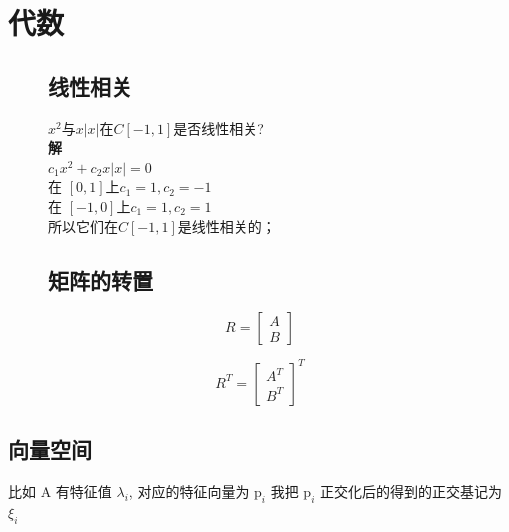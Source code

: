 \documentclass[fontset=windows]{article}
\begin{document}
    \section{代数}
    \begin{figure}[!htb]
        \begin{minipage}[t]{0.4\linewidth}
            \subsection{线性相关}
            $x^{2}$与$x|x|$在$C[-1,1]$是否线性相关?\\
            \noindent\textbf{解}\\
            $c_{1} x^{2}+c_{2} x|x|=0 $\\
            在 $[0,1]$上$c_{1}=1,c_{2}=-1$ \\
            在 $[-1,0]$上$c_{1}=1,c_{2}=1$ \\
            所以它们在$C[-1,1]$是线性相关的；
        \end{minipage}
    \hfill
        \begin{minipage}[t]{0.4\linewidth}
            \subsection{矩阵的转置} 
                \begin{minipage}{0.5\linewidth}
                    \[ R =\begin{bmatrix}
                    A\\
                    B
                \end{bmatrix}\]
                \end{minipage}
                \begin{minipage}{0.5\linewidth}
                \[R^T=\begin{bmatrix}
                    A^T\\
                    B^T
                \end{bmatrix}^T\]
                \end{minipage}
        \end{minipage}
    \end{figure}
   
    \subsection{向量空间}
    比如 $\mathrm{A}$ 有特征值 $\lambda_i$, 对应的特征向量为 $\mathrm{p}_i$
    我把 $\mathrm{p}_i$ 正交化后的得到的正交基记为 $\xi_i$
\end{document}

